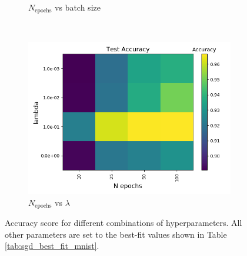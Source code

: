 \documentclass[a4paper]{article}
\newcommand{\Nepochs}{N_{\text{epochs}}}
\begin{document}
\begin{figure}[H]
\begin{subfigure}{0.49\textwidth}
    \caption{$\Nepochs$ vs batch size}
  \end{subfigure}\\
  \begin{subfigure}{0.49\textwidth}
    \includegraphics[scale=0.45]{../figures/task_e/test/heatmap_test_lr_constant_Nhyp4434_Accuracy_n_epochs_lambdas.png}
    \caption{$\Nepochs$ vs $\lambda$}
  \end{subfigure}
  \caption{Accuracy score for different combinations of hyperparameters. All other parameters are set to the best-fit values shown in Table \ref{tab:sgd_best_fit_mnist}.}
  \label{fig:sgd_mnist1}
\end{figure}
\end{document}
